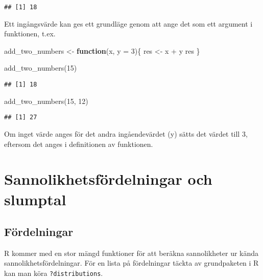\documentclass[
]{book}
\newenvironment{Shaded}{\begin{snugshade}}{\end{snugshade}}
\newcommand{\AttributeTok}[1]{\textcolor[rgb]{0.77,0.63,0.00}{#1}}
\newcommand{\ControlFlowTok}[1]{\textcolor[rgb]{0.13,0.29,0.53}{\textbf{#1}}}
\newcommand{\DecValTok}[1]{\textcolor[rgb]{0.00,0.00,0.81}{#1}}
\newcommand{\FunctionTok}[1]{\textcolor[rgb]{0.00,0.00,0.00}{#1}}
\newcommand{\NormalTok}[1]{#1}
\newcommand{\OtherTok}[1]{\textcolor[rgb]{0.56,0.35,0.01}{#1}}
\newcommand{\SpecialCharTok}[1]{\textcolor[rgb]{0.00,0.00,0.00}{#1}}
\theoremstyle{definition}
\theoremstyle{definition}
\theoremstyle{definition}
\theoremstyle{definition}
\theoremstyle{remark}
\begin{document}
\begin{verbatim}
## [1] 18
\end{verbatim}

Ett ingångsvärde kan ges ett grundläge genom att ange det som ett argument i funktionen, t.ex.

\begin{Shaded}
\begin{Highlighting}[]
\NormalTok{add\_two\_numbers }\OtherTok{\textless{}{-}} \ControlFlowTok{function}\NormalTok{(x, }\AttributeTok{y =} \DecValTok{3}\NormalTok{)\{}
\NormalTok{  res }\OtherTok{\textless{}{-}}\NormalTok{ x }\SpecialCharTok{+}\NormalTok{ y}
\NormalTok{  res}
\NormalTok{\}}

\FunctionTok{add\_two\_numbers}\NormalTok{(}\DecValTok{15}\NormalTok{)}
\end{Highlighting}
\end{Shaded}

\begin{verbatim}
## [1] 18
\end{verbatim}

\begin{Shaded}
\begin{Highlighting}[]
\FunctionTok{add\_two\_numbers}\NormalTok{(}\DecValTok{15}\NormalTok{, }\DecValTok{12}\NormalTok{)}
\end{Highlighting}
\end{Shaded}

\begin{verbatim}
## [1] 27
\end{verbatim}

Om inget värde anges för det andra ingåendevärdet (y) sätts det värdet till 3, eftersom det anges i definitionen av funktionen.

\hypertarget{sannolikhetsfuxf6rdelningar-och-slumptal}{%
\chapter{Sannolikhetsfördelningar och slumptal}\label{sannolikhetsfuxf6rdelningar-och-slumptal}}

\hypertarget{fuxf6rdelningar}{%
\section{Fördelningar}\label{fuxf6rdelningar}}

R kommer med en stor mängd funktioner för att beräkna sannolikheter ur kända sannolikhetsfördelningar. För en lista på fördelningar täckta av grundpaketen i R kan man köra \texttt{?distributions}.
\end{document}
